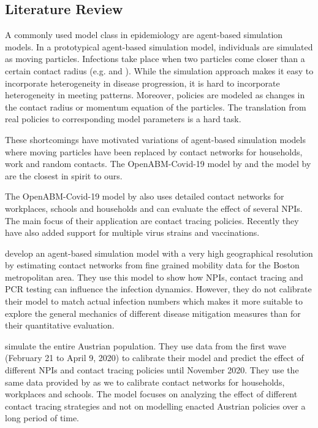 \subsection{Literature Review}
\label{sec:literature_review}

A commonly used model class in epidemiology are agent-based simulation
models. In a prototypical agent-based simulation model, individuals are
simulated as moving particles. Infections take place when two particles come closer than
a certain contact radius (e.g. \citet{Silva2020} and \citet{Cuevas2020}). While the
simulation approach makes it easy to incorporate heterogeneity in disease progression, it
is hard to incorporate heterogeneity in meeting patterns. Moreover, policies are modeled
as changes in the contact radius or momentum equation of the particles. The translation
from real policies to corresponding model parameters is a hard task.

These shortcomings have motivated variations of agent-based simulation models where
moving particles have been replaced by contact networks for households, work and random
contacts. The OpenABM-Covid-19 model by \citet{Hinch2020} and the model by
\citet{Aleta2020} are the closest in spirit to ours.


The OpenABM-Covid-19 model by \citet{Hinch2020} also uses detailed contact networks for
workplaces, schools and households and can evaluate the effect of several NPIs. The main
focus of their application are contact tracing policies. Recently they have also added
support for multiple virus strains and vaccinations.

\citet{Aleta2020} develop an agent-based simulation model with a very high geographical
resolution by estimating contact networks from fine grained mobility data for the
Boston metropolitan area. They use this model to show how NPIs, contact tracing and PCR
testing can influence the infection dynamics. However, they do not calibrate their model
to match actual infection numbers which makes it more suitable to explore the general
mechanics of different disease mitigation measures than for their quantitative
evaluation.

\citet{Bicher2021} simulate the entire Austrian population. They use data from the first
wave (February 21 to April 9, 2020) to calibrate their model and predict the effect of
different NPIs and contact tracing policies until November 2020. They use the same data
provided by \citet{Mossong2008} as we to calibrate contact networks for households,
workplaces and schools. The model focuses on analyzing the effect of different contact
tracing strategies and not on modelling enacted Austrian policies over a long period
of time.

